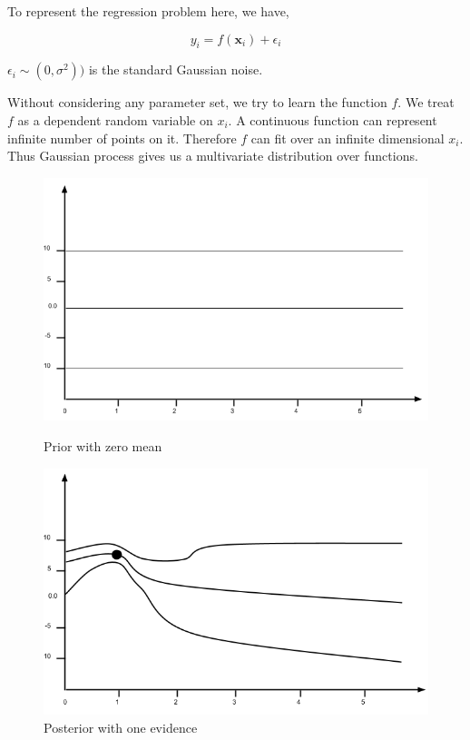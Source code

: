 \documentclass[english]{tktltiki}
\begin{document}
To represent the regression problem here, we have,

\begin{equation}
y_i = f(\mathbf{x}_i) + \epsilon_i
\end{equation}

$\epsilon_i \sim (0, \sigma^2))$ is the standard Gaussian noise.

Without considering any parameter set, we try to learn the function $f$. We treat $f$ as a dependent random variable on $x_i$. A continuous function can represent infinite number of points on it. Therefore $f$ can fit over an infinite dimensional $x_i$. Thus Gaussian process gives us a multivariate distribution over functions.

\begin{figure}
\centering
\begin{minipage}{.5\linewidth}
  \centering
  \includegraphics[width=\linewidth]{gp.png}
  \caption{Prior with zero mean}
  \label{fig:sub1}
\end{minipage}%
\begin{minipage}{.5\linewidth}
  \centering
  \includegraphics[width=\linewidth]{gp_2.png}
  \caption{Posterior with one evidence}
  \label{fig:sub2}
\end{minipage}


\end{figure}
\end{document}

